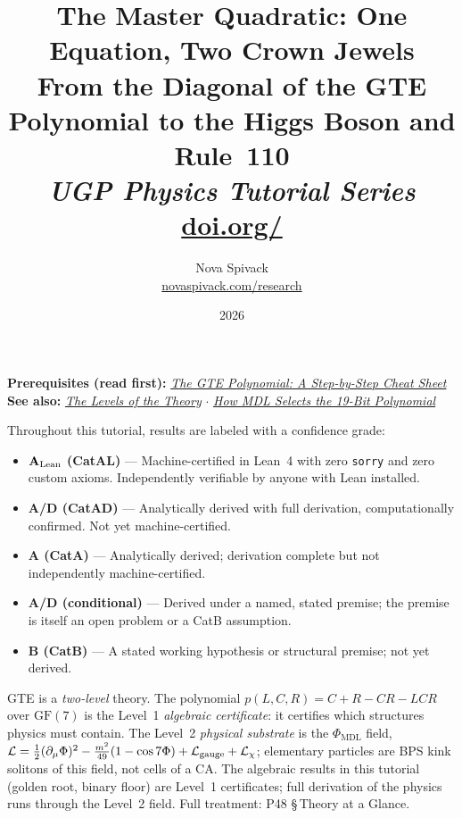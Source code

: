 \documentclass[11pt,a4paper]{article}
\title{\textbf{The Master Quadratic: One Equation, Two Crown Jewels}\\[6pt]
\large From the Diagonal of the GTE Polynomial to the Higgs Boson and Rule~110\\[4pt]
\normalsize\textit{UGP Physics Tutorial Series}
\\[2pt]\small\href{https://doi.org/\TutorialDOI}{doi.org/\TutorialDOI}}
\author{Nova Spivack\\[4pt]
\normalsize
\href{https://novaspivack.com/research}{novaspivack.com/research}
}
\date{2026}
\begin{document}
\setcounter{tocdepth}{2}
\maketitle
\tableofcontents
\newpage

\begin{tcolorbox}[colback=blue!6,colframe=blue!40!black,
  title=\textbf{UGP Physics Tutorial Series}]
\textbf{Prerequisites (read first):} \href{https://doi.org/10.5281/zenodo.20657889}{\emph{The GTE Polynomial: A Step-by-Step Cheat Sheet}}\\[4pt]
\textbf{See also:} \href{https://doi.org/10.5281/zenodo.20657872}{\emph{The Levels of the Theory}} $\cdot$
\href{https://doi.org/10.5281/zenodo.20657876}{\emph{How MDL Selects the 19-Bit Polynomial}}
\end{tcolorbox}

\begin{tcolorbox}[colback=boxgreen,colframe=green!50!black,
  title=\textbf{Claim-Strength Taxonomy}]
Throughout this tutorial, results are labeled with a confidence grade:
\begin{itemize}[itemsep=2pt]
  \item \textbf{$\mathbf{A}_{\rm Lean}$ (CatAL)} --- Machine-certified in Lean~4 with zero \texttt{sorry} and zero custom axioms.  Independently verifiable by anyone with Lean installed.
  \item \textbf{A/D (CatAD)} --- Analytically derived with full derivation, computationally confirmed.  Not yet machine-certified.
  \item \textbf{A (CatA)} --- Analytically derived; derivation complete but not independently machine-certified.
  \item \textbf{A/D (conditional)} --- Derived under a named, stated premise; the premise is itself an open problem or a CatB assumption.
  \item \textbf{B (CatB)} --- A stated working hypothesis or structural premise; not yet derived.
\end{itemize}
\end{tcolorbox}

\begin{tcolorbox}[colback=green!4,colframe=green!55!black,
  title={\textbf{Two Levels: Certificate and Field}},
  fonttitle=\small\bfseries, left=6pt, right=6pt, top=4pt, bottom=4pt]
\small
GTE is a \emph{two-level} theory.  The polynomial
$p(L,C,R) = C+R-CR-LCR$ over $\mathrm{GF}(7)$ is the Level~1
\emph{algebraic certificate}: it certifies which structures physics must contain.
The Level~2 \emph{physical substrate} is the $\Phi_{\mathrm{MDL}}$ field,
$\mathcal{L} = \tfrac{1}{2}(\partial_\mu\Phi)^2 - \tfrac{m^2}{49}(1-\cos 7\Phi)
+ \mathcal{L}_{\rm gauge} + \mathcal{L}_\chi$;
elementary particles are BPS kink solitons of this field, not cells of a CA.
The algebraic results in this tutorial (golden root, binary floor) are
Level~1 certificates; full derivation of the physics runs through the Level~2
field.  Full treatment: P48 \S\,Theory at a Glance.
\end{tcolorbox}
\end{document}
